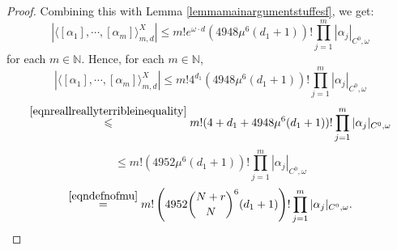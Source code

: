 \documentclass[10pt,a4paper]{amsart}
\newcommand{\bN}{\mathbb{N}}
\renewcommand{\leq}{\leqslant}
\begin{document}
\begin{proof}
	Combining this with Lemma \ref{lemmamainargumentstuffesf},
	we get:
	\begin{equation} \label{eqn3tr943t049444}
		\left| \langle [\alpha_1],\cdots,[\alpha_m] \rangle_{m,d}^X \right|
		\leq m!e^{\omega \cdot d}(4948\mu^6(d_1+1))!
		\prod_{j=1}^m |\alpha_j|_{C^0,\omega}
	\end{equation}
	for each $m \in \bN$.
	Hence, for each $m \in \bN$,
	\begin{equation} \label{eqn3tr943t0494444}
		\left| \langle [\alpha_1],\cdots,[\alpha_m] \rangle_{m,d}^X \right|
		\leq m!4^{d_1}(4948\mu^6(d_1+1))!
		\prod_{j=1}^m |\alpha_j|_{C^0,\omega}
	\end{equation}
	\begin{equation}
		\overset{\textnormal{\eqref{eqnreallreallyterribleinequality}}}{\leq}
		m!(4+d_1+4948\mu^6(d_1+1))!
		\prod_{j=1}^m |\alpha_j|_{C^0,\omega}
	\end{equation}
	\begin{equation}
		\leq
		m!(4952\mu^6(d_1+1))!
		\prod_{j=1}^m |\alpha_j|_{C^0,\omega}
	\end{equation}
	\begin{equation}
		\overset{\textnormal{\eqref{eqndefnofmu}}}{=}
		m!\left(4952{N+r \choose N}^6(d_1+1)\right)!
		\prod_{j=1}^m |\alpha_j|_{C^0,\omega}.
	\end{equation}
\end{proof}
\end{document}
